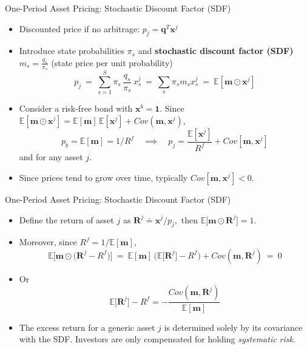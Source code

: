 \documentclass[aspectratio=1610]{beamer}
\newcommand{\eq}{\ =\ }
\newcommand{\bb}{\mathbb}
\begin{document}
\begin{frame}{One-Period Asset Pricing: Stochastic Discount Factor (SDF)}
\begin{itemize}
  \item Discounted price if no arbitrage: $p_j = \bm q^T\bm x^j$

  \item Introduce state probabilities $\pi_s$ and {\bf stochastic discount factor (SDF)} $m_s = \frac{q_s}{\pi_s}$ (state price per unit probability)
  \begin{equation}
    p_j \eq \sum_{s=1}^S \pi_s\, \frac{q_s}{\pi_s}\, x^j_s
    \eq \sum_s \pi_s m_s x^j_s \eq \bb E[\bm m \odot \bm x^j]
  \end{equation}

  \item Consider a risk-free bond with $\bm x^b = \bm 1$. Since $\bb E[\bm m \odot \bm x^j] = \bb E[\bm m]\, \bb E[\bm x^j] + Cov(\bm m, \bm x^j)$,
  \begin{equation}
    p_b = \bb E [\bm m] = 1/R^f \quad \implies \quad
    p_j = \frac{\bb E[\bm x^j]}{R^f} + Cov[\bm m, \bm x^j]
  \end{equation}
  and for any asset $j$.

  \item Since prices tend to grow over time, typically $Cov[\bm m, \bm x^j]<0$.

\end{itemize}

\end{frame}

\begin{frame}{One-Period Asset Pricing: Stochastic Discount Factor (SDF)}
\begin{itemize}
  \item Define the return of asset $j$ as $\bm R^j\doteq\bm x^j/p_j,$
  then $\bb E\big[\bm m \odot \bm R^j\big] = 1$.
  \item Moreover, since $R^f = 1/\bb E[\bm m]$,
  \begin{equation}
    \bb E\Big[\bm m \odot \big(\bm R^j - R^f\big)\Big] \eq
    \bb E[\bm m]\, \Big(\bb E\big[\bm R^j\big] - R^f\Big)
    + Cov(\bm m, \bm R^j) \eq 0
  \end{equation}

  \item Or
  \begin{equation}
    \bb E\big[\bm R^j\big] - R^f = -\frac{Cov(\bm m, \bm R^j)}{\bb E[\bm m]}
  \end{equation}

  \item The excess return for a generic asset $j$ is determined solely by its covariance with the SDF. Investors are only compensated for holding {\em systematic risk}.

\end{itemize}
\end{frame}
\end{document}
